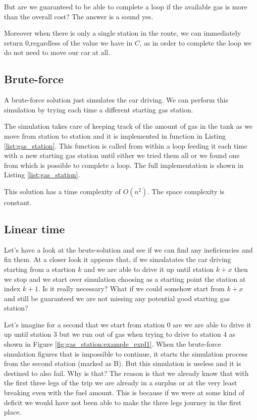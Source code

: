 But are we guaranteed to be able to complete a loop if the available gas is more than the overall cost? The answer is a sound yes.

Moreover when there is only a single station in the route, we can immediately return $0$,regardless of the value we have in $C$, as in order to complete the loop we do not need to move our car at all.

\subsection{Brute-force}
\label{gas_station:sec:bruteforce}
A brute-force solution just simulates the car driving. We can perform this simulation by trying each time a different starting gas station. 

The simulation takes care of keeping track of the amount of gas in the tank as we move from station to station and it is implemented in function  in Listing \ref{list:gas_station}.
This function is called from within a loop feeding it each time with a new starting gas station until either we tried them all or we found one from which is possible to complete a loop. The full implementation is shown in Listing \ref{list:gas_station}.




This solution has a time complexity of $O(n^2)$. The space complexity is constant.


\subsection{Linear time}
\label{gas_station:sec:linear_time}
Let's have a look at the brute-solution and see if we can find any ineficiencies and fix them. 
At a closer look it appears that, if we simulatates the car driving starting from a startion $k$ and we are able to drive it up until station $k+x$ then we stop and we start over simulation choosing as a starting point the station at index $k+1$. 
Is it really necessary? What if we could somehow start from $k+x$ and still be guaranteed we are not missing any potential good starting gas station?

Let's imagine for a second that we start from station $0$ are we are able to drive it up until station $3$ but we run out of gas when trying to drive to station $4$ as shown in Figure \ref{fig:gas_station:example_expl1}. When the brute-force simulation figures that is impossible to continue, it starts the simulation process from the second station (marked as B). But this simulation is useless and it is destined to also fail. Why is that? The reason is that we already know that with the first three legs of the trip we are already in a surplus or at the very least breaking even with the fuel amount. This is because if we were at some kind of deficit we would have not been able to make the three legs journey in the first place.

